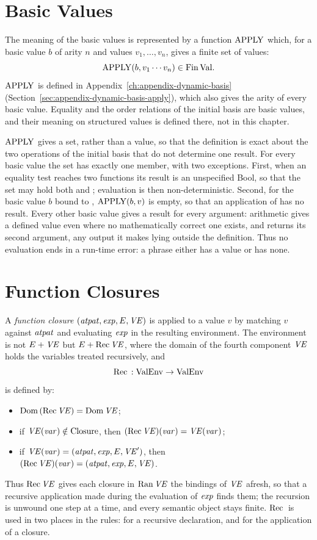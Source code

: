 \section{Basic Values}\label{sec:dynamic-core-basic}

The meaning of the basic values is represented by a function $\mathrm{APPLY}$ which,
for a basic value $b$ of arity $n$ and values $v_1,\ldots,v_n$, gives a finite
set of values:
\[
  \mathrm{APPLY}(b, v_1\cdots v_n)\in\mathrm{Fin}\,\mathrm{Val} .
\]
$\mathrm{APPLY}$ is defined in Appendix~\ref{ch:appendix-dynamic-basis}
(Section~\ref{sec:appendix-dynamic-basis-apply}), which also gives the arity
of every basic value. Equality and the order relations of the initial basis
are basic values, and their meaning on structured values is defined there,
not in this chapter. %

$\mathrm{APPLY}$ gives a set, rather than a value, so that the definition is exact
about the two operations of the initial basis that do not determine one
result. For every basic value the set has exactly one member, with two
exceptions. First, when an equality test reaches two functions its result is
an unspecified Bool, so that the set may hold both  and ;
evaluation is then non-deterministic. %
Second, for the basic value $b$ bound to , $\mathrm{APPLY}(b,v)$ is
empty, so that an application of  has no result. %
Every other basic value gives a result for every argument: arithmetic gives a
defined value even where no mathematically correct one exists, %
and  returns its second argument, any output it makes lying
outside the definition. %
Thus no evaluation ends in a run-time error: a phrase either has a value or
has none. %

\section{Function Closures}\label{sec:dynamic-core-closures}

A \emph{function closure} $(\mathit{atpat},\mathit{exp},E,\mathit{VE})$ is applied to a value $v$ by
matching $v$ against $\mathit{atpat}$ and evaluating $\mathit{exp}$ in the resulting
environment. The environment is not $E+\mathit{VE}$ but $E+\mathrm{Rec}\,\mathit{VE}$, where the
domain of the fourth component $\mathit{VE}$ holds the variables treated recursively,
and
\[
  \mathrm{Rec}\, : \mathrm{ValEnv}\to\mathrm{ValEnv}
\]
is defined by:
\begin{itemize}
\item $\mathrm{Dom}\,(\mathrm{Rec}\,\mathit{VE})=\mathrm{Dom}\,\mathit{VE}$;
\item if $\mathit{VE}(\mathit{var})\notin\mathrm{Closure}$, then $(\mathrm{Rec}\,\mathit{VE})(\mathit{var})=\mathit{VE}(\mathit{var})$;
\item if $\mathit{VE}(\mathit{var})=(\mathit{atpat},\mathit{exp},E,\mathit{VE}')$, then\\
  $(\mathrm{Rec}\,\mathit{VE})(\mathit{var})=(\mathit{atpat},\mathit{exp},E,\mathit{VE})$.
\end{itemize}
Thus $\mathrm{Rec}\,\mathit{VE}$ gives each closure in $\mathrm{Ran}\,\mathit{VE}$ the bindings of $\mathit{VE}$ afresh,
so that a recursive application made during the evaluation of $\mathit{exp}$ finds
them; the recursion is unwound one step at a time, and every semantic object
stays finite. $\mathrm{Rec}\,$ is used in two places in the rules: for a recursive
declaration, and for the application of a closure.

